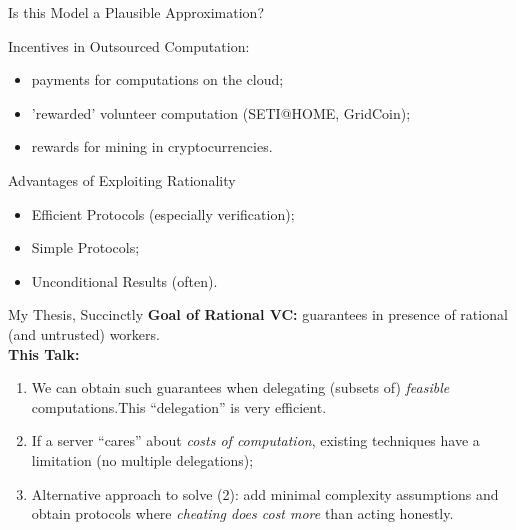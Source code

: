 \begin{frame}{Is this Model a Plausible Approximation?}
\begin{block}{Incentives in Outsourced Computation:}
	\begin{itemize}[<+- | alert@+>]
		\item  payments for computations on the cloud; %
		\item 'rewarded' volunteer computation (SETI@HOME, GridCoin);
		\item  rewards for mining in cryptocurrencies.
	\end{itemize}
\end{block}
\end{frame}

\begin{frame}{Advantages of Exploiting Rationality}

	\begin{itemize}[<+- | alert@+>]
		\item Efficient Protocols (especially verification);
		\item Simple Protocols;
		\item  Unconditional Results (often).
	\end{itemize}

\end{frame}


\begin{frame}[t]{My Thesis, Succinctly}
	\textbf{Goal of Rational VC:} guarantees in presence of rational (and untrusted) workers.\\\vspace{0.9cm} \pause
	\textbf{This Talk:}\\
	\begin{enumerate}
		\item We can obtain such guarantees when delegating (subsets of) \textit{feasible} computations.\pause This ``delegation'' is very efficient.\pause
		\item If a server ``cares'' about \textit{costs of computation}, existing techniques have a limitation (no multiple delegations); \pause %
		\item Alternative approach to solve (2): add minimal complexity assumptions and obtain protocols where \textit{cheating does cost more} than acting honestly.
	\end{enumerate}
\end{frame}

